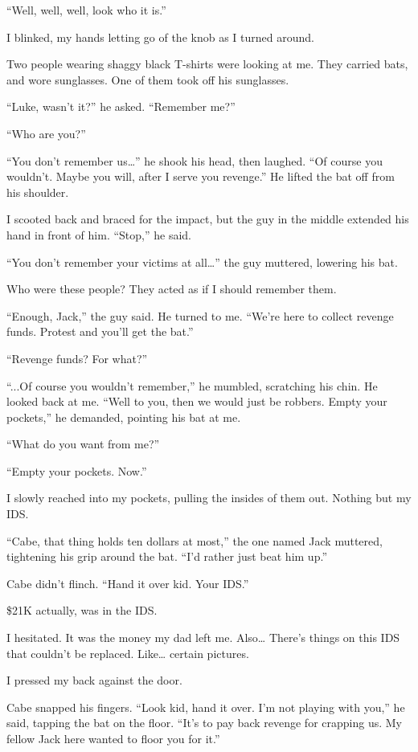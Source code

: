 “Well, well, well, look who it is.”

I blinked, my hands letting go of the knob as I turned around.

Two people wearing shaggy black T-shirts were looking at me. They carried bats, and wore sunglasses. One of them took off his sunglasses.

“Luke, wasn’t it?” he asked. “Remember me?”

“Who are you?”

“You don’t remember us…” he shook his head, then laughed. “Of course you wouldn’t. Maybe you will, after I serve you revenge.” He lifted the bat off from his shoulder.

I scooted back and braced for the impact, but the guy in the middle extended his hand in front of him. “Stop,” he said.

“You don’t remember your victims at all…” the guy muttered, lowering his bat.

Who were these people? They acted as if I should remember them.

“Enough, Jack,” the guy said. He turned to me. “We’re here to collect revenge funds. Protest and you’ll get the bat.”

“Revenge funds? For what?”

“...Of course you wouldn’t remember,” he mumbled, scratching his chin. He looked back at me. “Well to you, then we would just be robbers. Empty your pockets,” he demanded, pointing his bat at me.

“What do you want from me?”

“Empty your pockets. Now.”

I slowly reached into my pockets, pulling the insides of them out. Nothing but my IDS.

“Cabe, that thing holds ten dollars at most,” the one named Jack muttered, tightening his grip around the bat.  “I’d rather just beat him up.” 

Cabe didn’t flinch. “Hand it over kid. Your IDS.”

\$21K actually, was in the IDS. 

I hesitated. It was the money my dad left me. Also… There’s things on this IDS that couldn’t be replaced. Like… certain pictures.

I pressed my back against the door. 

Cabe snapped his fingers. “Look kid, hand it over. I’m not playing with you,” he said, tapping the bat on the floor. “It’s to pay back revenge for crapping us. My fellow Jack here wanted to floor you for it.”

